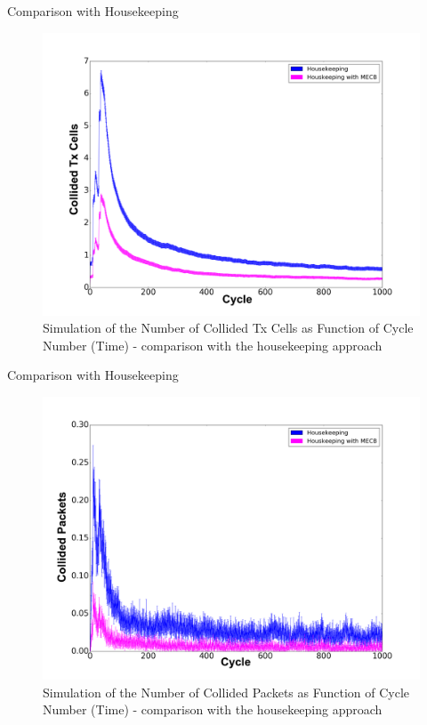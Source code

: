 \begin{withoutheadline}
\begin{frame}{Comparison with Housekeeping }

\begin{figure}[p]

\includegraphics[width=0.8\linewidth]{figures/Graph3.png}
\caption{Simulation of the Number of Collided Tx Cells as Function of Cycle Number (Time) - comparison with the housekeeping approach}
\end{figure}



\end{frame}
\end{withoutheadline}

\begin{withoutheadline}
\begin{frame}{Comparison with Housekeeping}

\begin{figure}[p]

\includegraphics[width=0.8\linewidth]{figures/Graph4.png}
\caption{Simulation of the Number of Collided Packets as Function of Cycle Number (Time) - comparison with the housekeeping approach }
\end{figure}



\end{frame}
\end{withoutheadline}

